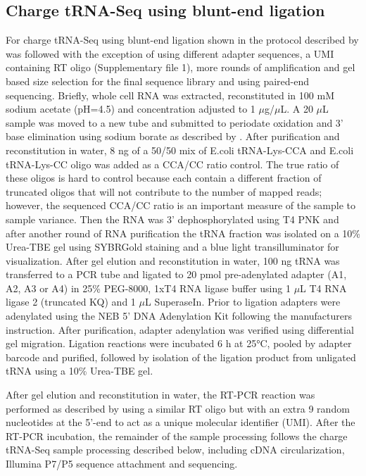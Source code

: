 \documentclass[9pt,lineno]{elife}
\begin{document}
\subsection{Charge tRNA-Seq using blunt-end ligation}
For charge tRNA-Seq using blunt-end ligation shown in  the protocol described by \cite{Behrens2021-gb} was followed with the exception of using different adapter sequences, a UMI containing RT oligo (Supplementary file 1), more rounds of amplification and gel based size selection for the final sequence library and using paired-end sequencing.
Briefly, whole cell RNA was extracted, reconstituted in 100 mM sodium acetate (pH=4.5) and concentration adjusted to 1 $\mu$g/$\mu$L.
A 20 $\mu$L sample was moved to a new tube and submitted to periodate oxidation and 3’ base elimination using sodium borate as described by \cite{Evans2017-st}.
After purification and reconstitution in water, 8 ng of a 50/50 mix of E.coli tRNA-Lys-CCA and E.coli tRNA-Lys-CC oligo was added as a CCA/CC ratio control.
The true ratio of these oligos is hard to control because each contain a different fraction of truncated oligos that will not contribute to the number of mapped reads; however, the sequenced CCA/CC ratio is an important measure of the sample to sample variance.
Then the RNA was 3’ dephosphorylated using T4 PNK and after another round of RNA purification the tRNA fraction was isolated on a 10\% Urea-TBE gel using SYBRGold staining and a blue light transilluminator for visualization.
After gel elution and reconstitution in water, 100 ng tRNA was transferred to a PCR tube and ligated to 20 pmol pre-adenylated adapter (A1, A2, A3 or A4) in 25\% PEG-8000, 1xT4 RNA ligase buffer using 1 $\mu$L T4 RNA ligase 2 (truncated KQ) and 1 $\mu$L SuperaseIn.
Prior to ligation adapters were adenylated using the NEB 5’ DNA Adenylation Kit following the manufacturers instruction.
After purification, adapter adenylation was verified using differential gel migration.
Ligation reactions were incubated 6 h at 25°C, pooled by adapter barcode and purified, followed by isolation of the ligation product from unligated tRNA using a 10\% Urea-TBE gel.

After gel elution and reconstitution in water, the RT-PCR reaction was performed as described by \cite{Behrens2021-gb} using a similar RT oligo but with an extra 9 random nucleotides at the 5’-end to act as a unique molecular identifier (UMI).
After the RT-PCR incubation, the remainder of the sample processing follows the charge tRNA-Seq sample processing described below, including cDNA circularization, Illumina P7/P5 sequence attachment and sequencing.
\end{document}
